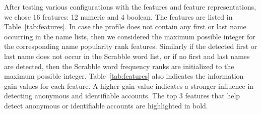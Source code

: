 \documentclass[conference]{IEEEtran}
\begin{document}
After testing various configurations with the features and feature representations, we chose 16 features: 12 numeric and 4 boolean. The features are listed in Table~\ref{tab:features}. In case the profile does not contain any first or last name occurring in the name lists, then we considered the maximum possible integer for the corresponding name popularity rank features. Similarly if the detected first or last name does not occur in the Scrabble word list, or if no first and last names are detected, then the Scrabble word frequency ranks are initialized to the maximum possible integer. Table~\ref{tab:features} also indicates the information gain values for each feature. A higher gain value indicates a stronger influence in detecting anonymous and identifiable accounts. The top 3 features that help detect anonymous or identifiable accounts are highlighted in bold.
\end{document}
